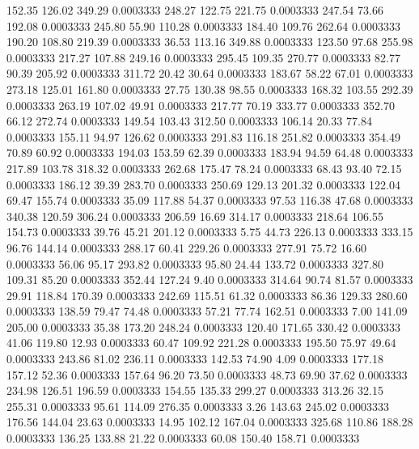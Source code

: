  152.35  126.02  349.29   0.0003333
 248.27  122.75  221.75   0.0003333
 247.54   73.66  192.08   0.0003333
 245.80   55.90  110.28   0.0003333
 184.40  109.76  262.64   0.0003333
 190.20  108.80  219.39   0.0003333
  36.53  113.16  349.88   0.0003333
 123.50   97.68  255.98   0.0003333
 217.27  107.88  249.16   0.0003333
 295.45  109.35  270.77   0.0003333
  82.77   90.39  205.92   0.0003333
 311.72   20.42   30.64   0.0003333
 183.67   58.22   67.01   0.0003333
 273.18  125.01  161.80   0.0003333
  27.75  130.38   98.55   0.0003333
 168.32  103.55  292.39   0.0003333
 263.19  107.02   49.91   0.0003333
 217.77   70.19  333.77   0.0003333
 352.70   66.12  272.74   0.0003333
 149.54  103.43  312.50   0.0003333
 106.14   20.33   77.84   0.0003333
 155.11   94.97  126.62   0.0003333
 291.83  116.18  251.82   0.0003333
 354.49   70.89   60.92   0.0003333
 194.03  153.59   62.39   0.0003333
 183.94   94.59   64.48   0.0003333
 217.89  103.78  318.32   0.0003333
 262.68  175.47   78.24   0.0003333
  68.43   93.40   72.15   0.0003333
 186.12   39.39  283.70   0.0003333
 250.69  129.13  201.32   0.0003333
 122.04   69.47  155.74   0.0003333
  35.09  117.88   54.37   0.0003333
  97.53  116.38   47.68   0.0003333
 340.38  120.59  306.24   0.0003333
 206.59   16.69  314.17   0.0003333
 218.64  106.55  154.73   0.0003333
  39.76   45.21  201.12   0.0003333
   5.75   44.73  226.13   0.0003333
 333.15   96.76  144.14   0.0003333
 288.17   60.41  229.26   0.0003333
 277.91   75.72   16.60   0.0003333
  56.06   95.17  293.82   0.0003333
  95.80   24.44  133.72   0.0003333
 327.80  109.31   85.20   0.0003333
 352.44  127.24    9.40   0.0003333
 314.64   90.74   81.57   0.0003333
  29.91  118.84  170.39   0.0003333
 242.69  115.51   61.32   0.0003333
  86.36  129.33  280.60   0.0003333
 138.59   79.47   74.48   0.0003333
  57.21   77.74  162.51   0.0003333
   7.00  141.09  205.00   0.0003333
  35.38  173.20  248.24   0.0003333
 120.40  171.65  330.42   0.0003333
  41.06  119.80   12.93   0.0003333
  60.47  109.92  221.28   0.0003333
 195.50   75.97   49.64   0.0003333
 243.86   81.02  236.11   0.0003333
 142.53   74.90    4.09   0.0003333
 177.18  157.12   52.36   0.0003333
 157.64   96.20   73.50   0.0003333
  48.73   69.90   37.62   0.0003333
 234.98  126.51  196.59   0.0003333
 154.55  135.33  299.27   0.0003333
 313.26   32.15  255.31   0.0003333
  95.61  114.09  276.35   0.0003333
   3.26  143.63  245.02   0.0003333
 176.56  144.04   23.63   0.0003333
  14.95  102.12  167.04   0.0003333
 325.68  110.86  188.28   0.0003333
 136.25  133.88   21.22   0.0003333
  60.08  150.40  158.71   0.0003333
